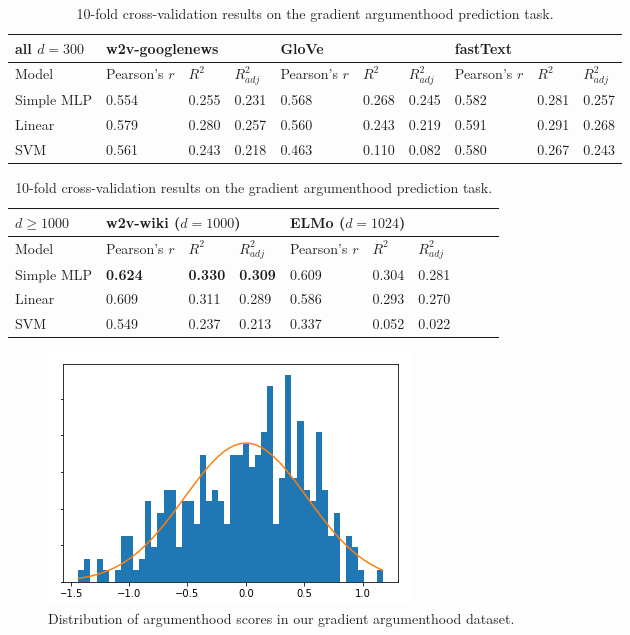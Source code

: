 \documentclass[letterpaper]{article} %
\begin{document}
\begin{table}[h]
	\centering
	\begin{tabular}{@{}llllllllll@{}}
		\toprule
		 all $d=300$ & \multicolumn{3}{l}{w2v-googlenews} & \multicolumn{3}{l}{GloVe} & \multicolumn{3}{l}{fastText}\\ \midrule
		Model       & Pearson's $r$ & $R^2$ & $R^2_{adj}$ & Pearson's $r$ & $R^2$ & $R^2_{adj}$ & Pearson's $r$ & $R^2$ & $R^2_{adj}$  \\ \midrule
		Simple MLP & 0.554 & 0.255 &  0.231  \hspace{1cm} & 0.568 & 0.268 & 0.245 \hspace{1cm} & 0.582 & 0.281 & 0.257\\
		Linear & 0.579 & 0.280 & 0.257 & 0.560 & 0.243 & 0.219 & 0.591 & 0.291 & 0.268 \\
		SVM & 0.561 & 0.243 & 0.218 & 0.463 & 0.110 & 0.082 & 0.580 & 0.267 & 0.243 \\
		\midrule
	\end{tabular}
	\begin{tabular}{@{}llllllllll@{}}
		\midrule
		$d \ge 1000$& \multicolumn{3}{l}{w2v-wiki\footnotemark \hspace{0.05cm} ($d=1000$)}  & \multicolumn{3}{l}{ELMo ($d=1024$)} \\ \midrule
		Model       & Pearson's $r$ & $R^2$ & $R^2_{adj}$ & Pearson's $r$ & $R^2$  & $R^2_{adj}$ \\ \midrule
		Simple MLP & \textbf{0.624}  & \textbf{0.330} &  \textbf{0.309} \hspace{1cm} & 0.609 & 0.304 & 0.281 \\
		Linear & 0.609 & 0.311 & 0.289 & 0.586 & 0.293  & 0.270 \\
		SVM & 0.549 & 0.237 & 0.213 & 0.337 & 0.052  & 0.022  \\
		\bottomrule
	\end{tabular}
	\caption{10-fold cross-validation results on the gradient argumenthood prediction task.}
	\label{ex2:results}
\end{table}

\begin{figure}[h]
	\centering
	\includegraphics[width=0.8\linewidth]{distribution}
	\caption{Distribution of argumenthood scores in our gradient argumenthood dataset.}
	\label{fig:dist}
\end{figure}
\end{document}
